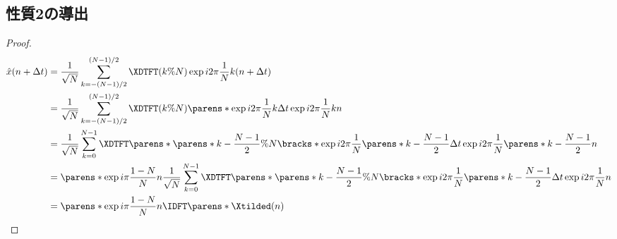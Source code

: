         \subsection{性質2の導出}
            \begin{proof}
                \begin{align*}
                    \hat{x}(n+\Delta t) &= \frac{1}{\sqrt{N}}\sum_{k=-(N-1)/2}^{(N-1)/2}\XDTFT(k\%N)\exp i2\pi\frac{1}{N}k(n+\Delta t) \\
                    &= \frac{1}{\sqrt{N}}\sum_{k=-(N-1)/2}^{(N-1)/2}\XDTFT(k\%N)\parens*{\exp i2\pi\frac{1}{N}k\Delta t}\exp i2\pi\frac{1}{N}kn \\
                    &= \frac{1}{\sqrt{N}}\sum_{k=0}^{N-1}\XDTFT\parens*{\parens*{k-\frac{N-1}{2}}\%N}\bracks*{\exp i2\pi\frac{1}{N}\parens*{k-\frac{N-1}{2}}\Delta t}\exp i2\pi\frac{1}{N}\parens*{k-\frac{N-1}{2}}n \\
                    &= \parens*{\exp i\pi\frac{1-N}{N}n}\frac{1}{\sqrt{N}}\sum_{k=0}^{N-1}\XDTFT\parens*{\parens*{k-\frac{N-1}{2}}\%N}\bracks*{\exp i2\pi\frac{1}{N}\parens*{k-\frac{N-1}{2}}\Delta t}\exp i2\pi\frac{1}{N}n \\
                    &= \parens*{\exp i\pi\frac{1-N}{N}n}\IDFT\parens*{\Xtilded}(n)
                \end{align*}
            \end{proof}
